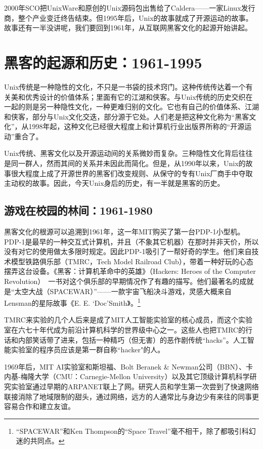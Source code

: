 \documentclass[12pt,oneside]{ctexbook}
\begin{document}
\begin{common-format}
2000年SCO把UnixWare和原创的Unix源码包出售给了Caldera——一家Linux发行商，整个产业变迁终告结束。但1995年后，Unix的故事就成了开源运动的故事。故事还有一半没讲呢，我们要回到1961年，从互联网黑客文化的起源开始讲起。

\section{黑客的起源和历史：1961-1995}
Unix传统是一种隐性的文化，不只是一书袋的技术窍门。这种传统传达着一个有关美和优秀设计的价值体系；里面有它的江湖和侠客。与Unix传统的历史交织在一起的则是另一种隐性文化，一种更难归别的文化。它也有自己的价值体系、江湖和侠客，部分与Unix文化交迭，部分源于它处。人们老是把这种文化称为“黑客文化”，从1998年起，这种文化已经很大程度上和计算机行业出版界所称的“开源运动”重合了。

Unix传统、黑客文化以及开源运动间的关系微妙而复杂。三种隐性文化背后往往是同一群人，然而其间的关系并未因此而简化。但是，从1990年以来，Unix的故事很大程度上成了开源世界的黑客们改变规则、从保守的专有Unix厂商手中夺取主动权的故事。因此，今天Unix身后的历史，有一半就是黑客的历史。


\subsection{游戏在校园的林间：1961-1980}
黑客文化的根源可以追溯到1961年，这一年MIT购买了第一台PDP-1小型机。PDP-1是最早的一种交互式计算机，并且（不象其它机器）在那时并非天价，所以没有对它的使用做太多限时规定。因此PDP-1吸引了一帮好奇的学生。他们来自技术模型铁路俱乐部（TMRC，Tech Model Railroad Club），带着一种好玩的心态摆弄这台设备。《黑客：计算机革命中的英雄》（Hackers:  Heroes of the Computer Revolution）~\cite{Levy}一书对这个俱乐部的早期情况作了有趣的描写。他们最著名的成就是“太空大战（SPACEWAR）”——一款宇宙飞船决斗游戏，灵感大概来自Lensman的星际故事《E. E. ‘Doc’Smith》。\footnote{“SPACEWAR”和Ken Thompson的“Space Travel”毫不相干，除了都吸引科幻迷的共同点。}

TMRC来实验的几个人后来是成了MIT人工智能实验室的核心成员，而这个实验室在六七十年代成为前沿计算机科学的世界级中心之一。这些人也把TMRC的行话和内部笑话带了进来，包括一种精巧（但无害）的恶作剧传统“hacks”。人工智能实验室的程序员应该是第一群自称“hacker"的人。

1969年后，MIT AI实验室和斯坦福、Bolt Beranek \& Newman公司（BBN）、卡内基-梅隆大学（CMU：Carnegie-Mellon University）以及其它顶级计算机科学研究实验室通过早期的ARPANET联上了网。研究人员和学生第一次尝到了快速网络联接消除了地域限制的甜头，通过网络，远方的人通常比与身边少有来往的同事更容易合作和建立友谊。


\end{common-format}
\end{document}
